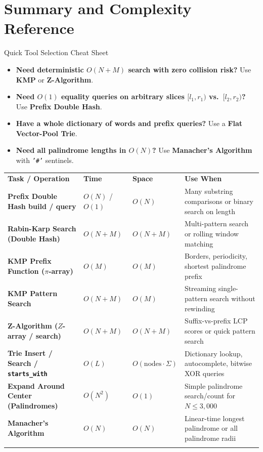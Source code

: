 \documentclass[11pt,a4paper]{article}
\theoremstyle{definition}
\begin{document}
\section{Summary and Complexity Reference}

\begin{calloutbox}{Quick Tool Selection Cheat Sheet}
\begin{itemize}
    \item \textbf{Need deterministic $O(N + M)$ search with zero collision risk?} Use \textbf{KMP} or \textbf{Z-Algorithm}.
    \item \textbf{Need $O(1)$ equality queries on arbitrary slices $[l_1, r_1)$ vs.\ $[l_2, r_2)$?} Use \textbf{Prefix Double Hash}.
    \item \textbf{Have a whole dictionary of words and prefix queries?} Use a \textbf{Flat Vector-Pool Trie}.
    \item \textbf{Need all palindrome lengths in $O(N)$?} Use \textbf{Manacher's Algorithm} with \texttt{'\#'} sentinels.
\end{itemize}
\end{calloutbox}

\begingroup\small{}
\begin{tabularx}{\textwidth}{>{\raggedright\arraybackslash\bfseries}p{4.5cm} >{\centering\arraybackslash}p{1.9cm} >{\centering\arraybackslash}p{1.8cm} >{\raggedright\arraybackslash}X}
\arrayrulecolor{primaryblue}\toprule[1.2pt]
\rowcolor{primaryblue!10}
\textcolor{primaryblue}{\textbf{Task / Operation}} & \textcolor{primaryblue}{\textbf{Time}} & \textcolor{primaryblue}{\textbf{Space}} & \textcolor{primaryblue}{\textbf{Use When}} \\
\arrayrulecolor{codeframe}\midrule[0.6pt]
Prefix Double Hash build / query & $O(N)$ / $O(1)$ & $O(N)$ & Many substring comparisons or binary search on length \\
Rabin-Karp Search (Double Hash) & $O(N + M)$ & $O(N + M)$ & Multi-pattern search or rolling window matching \\
KMP Prefix Function ($\pi$-array) & $O(M)$ & $O(M)$ & Borders, periodicity, shortest palindrome prefix \\
KMP Pattern Search & $O(N + M)$ & $O(M)$ & Streaming single-pattern search without rewinding \\
Z-Algorithm ($Z$-array / search) & $O(N + M)$ & $O(N + M)$ & Suffix-vs-prefix LCP scores or quick pattern search \\
Trie Insert / Search / \texttt{starts\_with} & $O(L)$ & $O(\text{nodes} \cdot \Sigma)$ & Dictionary lookup, autocomplete, bitwise XOR queries \\
Expand Around Center (Palindromes) & $O(N^2)$ & $O(1)$ & Simple palindrome search/count for $N \le 3{,}000$ \\
Manacher's Algorithm & $O(N)$ & $O(N)$ & Linear-time longest palindrome or all palindrome radii \\
\arrayrulecolor{primaryblue}\bottomrule[1.2pt]
\end{tabularx}\endgroup
\end{document}
